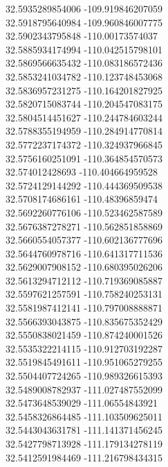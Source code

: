 {32.5935289854006	-109.919846207059\\
32.5918795640984	-109.960846007775\\
32.5902343795848	-110.00173574037\\
32.5885934174994	-110.042515798101\\
32.5869566635432	-110.083186572436\\
32.5853241034782	-110.123748453068\\
32.5836957231275	-110.164201827925\\
32.5820715083744	-110.204547083175\\
32.5804514451627	-110.244784603244\\
32.5788355194959	-110.284914770814\\
32.5772237174372	-110.324937966845\\
32.5756160251091	-110.364854570573\\
32.574012428693	-110.404664959528\\
32.5724129144292	-110.444369509538\\
32.5708174686161	-110.48396859474\\
32.5692260776106	-110.523462587589\\
32.5676387278271	-110.562851858869\\
32.5660554057377	-110.602136777696\\
32.5644760978716	-110.641317711536\\
32.5629007908152	-110.680395026206\\
32.5613294712112	-110.719369085887\\
32.5597621257591	-110.758240253131\\
32.5581987412141	-110.797008888871\\
32.5566393043875	-110.835675352429\\
32.5550838021459	-110.874240001526\\
32.5535322214115	-110.912703192287\\
32.5519845491611	-110.951065279255\\
32.5504407724265	-110.989326615393\\
32.5489008782937	-111.027487552099\\
32.5473648539029	-111.06554843921\\
32.5458326864485	-111.103509625011\\
32.5443043631781	-111.141371456245\\
32.5427798713928	-111.179134278119\\
32.5412591984469	-111.216798434315\\
}
